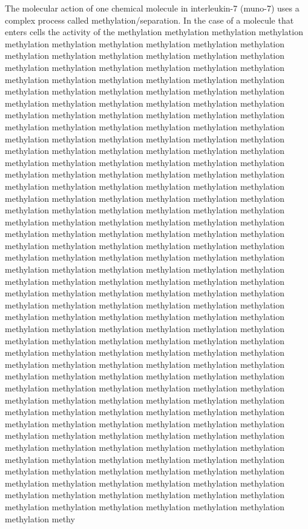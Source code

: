 \documentclass{article}
\begin{document}
The molecular action of one chemical molecule in interleukin-7 (muno-7) uses a complex process called methylation/separation. In the case of a molecule that enters cells the activity of the methylation methylation methylation methylation methylation methylation methylation methylation methylation methylation methylation methylation methylation methylation methylation methylation methylation methylation methylation methylation methylation methylation methylation methylation methylation methylation methylation methylation methylation methylation methylation methylation methylation methylation methylation methylation methylation methylation methylation methylation methylation methylation methylation methylation methylation methylation methylation methylation methylation methylation methylation methylation methylation methylation methylation methylation methylation methylation methylation methylation methylation methylation methylation methylation methylation methylation methylation methylation methylation methylation methylation methylation methylation methylation methylation methylation methylation methylation methylation methylation methylation methylation methylation methylation methylation methylation methylation methylation methylation methylation methylation methylation methylation methylation methylation methylation methylation methylation methylation methylation methylation methylation methylation methylation methylation methylation methylation methylation methylation methylation methylation methylation methylation methylation methylation methylation methylation methylation methylation methylation methylation methylation methylation methylation methylation methylation methylation methylation methylation methylation methylation methylation methylation methylation methylation methylation methylation methylation methylation methylation methylation methylation methylation methylation methylation methylation methylation methylation methylation methylation methylation methylation methylation methylation methylation methylation methylation methylation methylation methylation methylation methylation methylation methylation methylation methylation methylation methylation methylation methylation methylation methylation methylation methylation methylation methylation methylation methylation methylation methylation methylation methylation methylation methylation methylation methylation methylation methylation methylation methylation methylation methylation methylation methylation methylation methylation methylation methylation methylation methylation methylation methylation methylation methylation methylation methylation methylation methylation methylation methylation methylation methylation methylation methylation methylation methylation methylation methylation methylation methylation methylation methylation methylation methylation methylation methylation methylation methylation methylation methylation methylation methylation methylation methylation methylation methylation methylation methylation methylation methylation methylation methylation methylation methylation methylation methy
\end{document}
